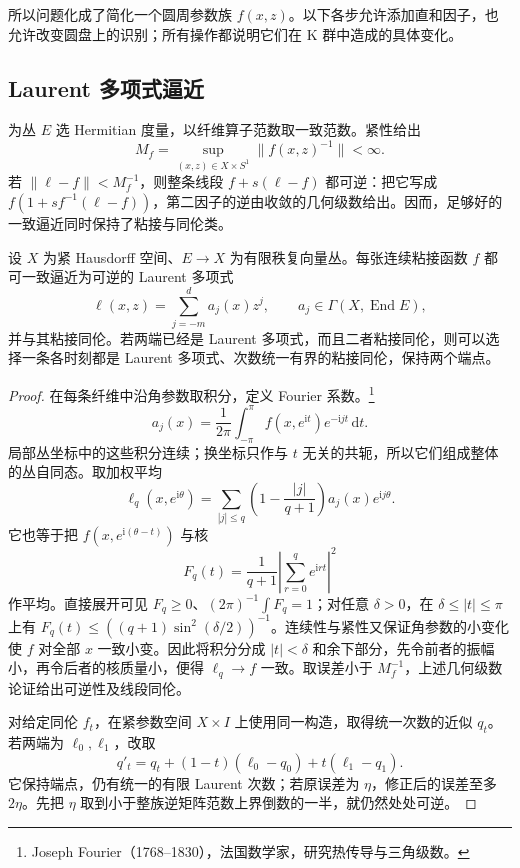 所以问题化成了简化一个圆周参数族 \(f(x,z)\)。以下各步允许添加直和因子，也允许改变圆盘上的识别；所有操作都说明它们在 K 群中造成的具体变化。

\subsection{Laurent 多项式逼近}
\label{g2:subsec:2403:03}
为丛 \(E\) 选 Hermitian 度量，以纤维算子范数取一致范数。紧性给出
\[
	M_f=\sup_{(x,z)\in X\times S^1}\lVert f(x,z)^{-1}\rVert<\infty.
\]
若 \(\lVert\ell-f\rVert<M_f^{-1}\)，则整条线段 \(f+s(\ell-f)\) 都可逆：把它写成 \(f(1+s f^{-1}(\ell-f))\)，第二因子的逆由收敛的几何级数给出。因而，足够好的一致逼近同时保持了粘接与同伦类。

\begin{lemma}\label{g2:lem:k-laurent-approximation}
	设 \(X\) 为紧 Hausdorff 空间、\(E\to X\) 为有限秩复向量丛。每张连续粘接函数 \(f\) 都可一致逼近为可逆的 Laurent 多项式
	\[
		\ell(x,z)=\sum_{j=-m}^{d}a_j(x)z^j,\qquad a_j\in\Gamma(X,\operatorname{End}E),
	\]
	并与其粘接同伦。若两端已经是 Laurent 多项式，而且二者粘接同伦，则可以选择一条各时刻都是 Laurent 多项式、次数统一有界的粘接同伦，保持两个端点。
\end{lemma}
\begin{proof}
	在每条纤维中沿角参数取积分，定义 Fourier 系数。\footnote{Joseph Fourier（1768--1830），法国数学家，研究热传导与三角级数。}
	\[
		a_j(x)=\frac1{2\pi}\int_{-\pi}^{\pi}f(x,e^{\mathrm it})e^{-\mathrm ijt}\,\mathrm dt.
	\]
	局部丛坐标中的这些积分连续；换坐标只作与 \(t\) 无关的共轭，所以它们组成整体的丛自同态。取加权平均
	\[
		\ell_q(x,e^{\mathrm i\theta})=
		\sum_{|j|\le q}\left(1-\frac{|j|}{q+1}\right)a_j(x)e^{\mathrm ij\theta}.
	\]
	它也等于把 \(f(x,e^{\mathrm i(\theta-t)})\) 与核
	\[
		F_q(t)=\frac1{q+1}\left|\sum_{r=0}^{q}e^{\mathrm irt}\right|^2
	\]
	作平均。直接展开可见 \(F_q\ge0\)、\((2\pi)^{-1}\int F_q=1\)；对任意 \(\delta>0\)，在 \(\delta\le|t|\le\pi\) 上有 \(F_q(t)\le((q+1)\sin^2(\delta/2))^{-1}\)。连续性与紧性又保证角参数的小变化使 \(f\) 对全部 \(x\) 一致小变。因此将积分分成 \(|t|<\delta\) 和余下部分，先令前者的振幅小，再令后者的核质量小，便得 \(\ell_q\to f\) 一致。取误差小于 \(M_f^{-1}\)，上述几何级数论证给出可逆性及线段同伦。

	对给定同伦 \(f_t\)，在紧参数空间 \(X\times I\) 上使用同一构造，取得统一次数的近似 \(q_t\)。若两端为 \(\ell_0,\ell_1\)，改取
	\[
		q'_t=q_t+(1-t)(\ell_0-q_0)+t(\ell_1-q_1).
	\]
	它保持端点，仍有统一的有限 Laurent 次数；若原误差为 \(\eta\)，修正后的误差至多 \(2\eta\)。先把 \(\eta\) 取到小于整族逆矩阵范数上界倒数的一半，就仍然处处可逆。
\end{proof}

